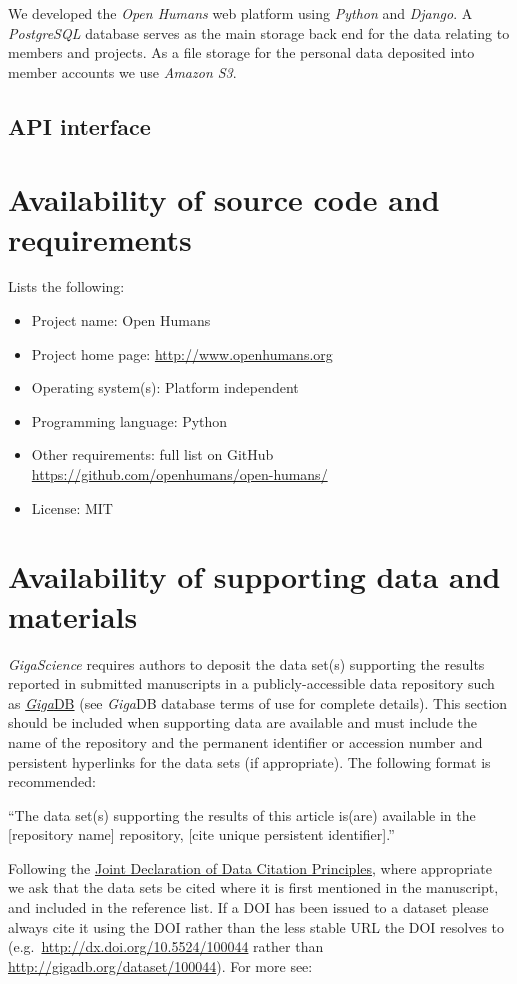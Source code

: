 \documentclass[a4paper,num-refs]{oup-contemporary}
\begin{document}
We developed the \textit{Open Humans} web platform using \textit{Python} and \textit{Django}. A \textit{PostgreSQL} database serves as the main storage back end for the data relating to members and projects. As a file storage for the personal data deposited into member accounts we use \textit{Amazon S3}. 

\subsection{API interface}


\section{Availability of source code and requirements}

Lists the following:
\begin{itemize}
\item Project name: Open Humans
\item Project home page: \url{http://www.openhumans.org}
\item Operating system(s): Platform independent
\item Programming language: Python
\item Other requirements: full list on GitHub \url{https://github.com/openhumans/open-humans/}
\item License: MIT
\end{itemize}

\section{Availability of supporting data and materials}

\textit{GigaScience} requires authors to deposit the data set(s) supporting the results reported in submitted manuscripts in a publicly-accessible data repository such as \href{http://gigadb.org/}{\textit{Giga}DB} (see \textit{Giga}DB database terms of use for complete details). This section should be included when supporting data are available and must include the name of the repository and the permanent identifier or accession number and persistent hyperlinks for the data sets (if appropriate). The following format is recommended:

``The data set(s) supporting the results of this article is(are) available in the [repository name] repository, [cite unique persistent identifier].''

Following the \href{https://www.force11.org/group/joint-declaration-data-citation-principles-final}{Joint Declaration of Data Citation Principles}, where appropriate we ask that the data sets be cited where it is first mentioned in the manuscript, and included in the reference list. If a DOI has been issued to a dataset please always cite it using the DOI rather than the less stable URL the DOI resolves to (e.g.~\url{http://dx.doi.org/10.5524/100044} rather than \url{http://gigadb.org/dataset/100044}). For more see:
\end{document}
